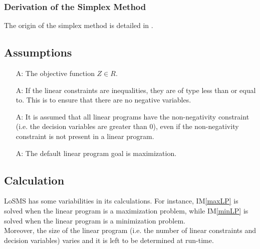 \documentclass[12pt]{article}
\newcounter{assumpnum} %
\newcommand{\iref}[1]{IM\ref{#1}}
\newcommand{\famname}{LoSMS} %
\begin{document}

\subsubsection*{Derivation of the Simplex Method}{
	The origin of the simplex method is detailed in \cite{simplex-origin}. 
}

\subsection{Assumptions} \label{Assumptions}

\begin{itemize}
	\item[A\refstepcounter{assumpnum}\theassumpnum \label{A_objFunSpace}:] The 
	objective function $Z \in R$.
	
	\item[A\refstepcounter{assumpnum}\theassumpnum \label{A_inequalities}:] If 
	the linear constraints are inequalities, they are of type less than or 
	equal to. This is to ensure that there are no negative variables.
	
	\item[A\refstepcounter{assumpnum}\theassumpnum \label{A_NonNegative}:] It 
	is assumed that all linear programs have the non-negativity constraint 
	(i.e. the decision variables are greater than 0), even if the 
	non-negativity constraint is not present in a linear program.
	
	\item[A\refstepcounter{assumpnum}\theassumpnum \label{A_GoalMax}:] The 
	default linear program goal is maximization.
\end{itemize}

\subsection{Calculation} \label{sec_Calculation}

\famname{} has some variabilities in its calculations. For instance, 
\iref{maxLP} is solved when the linear program is a maximization problem, while 
\iref{minLP} is solved when the linear program is a minimization 
problem. \\

Moreover, the size of the linear program (i.e. the number of linear 
constraints and decision variables) varies and it is left to be determined at 
run-time.
\end{document}
